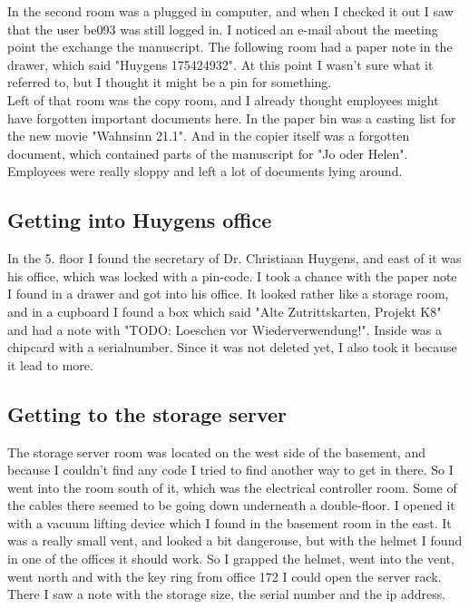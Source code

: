 In the second room was a plugged in computer, and when I checked it out I saw that the user be093 was still logged in. I noticed an e-mail about the meeting point the exchange the manuscript. The following room had a paper note in the drawer, which said "Huygens 175424932". At this point I wasn't sure what it referred to, but I thought it might be a pin for something. \\

Left of that room was the copy room, and I already thought employees might have forgotten important documents here. In the paper bin was a casting list for the new movie "Wahnsinn 21.1". And in the copier itself was a forgotten document, which contained parts of the manuscript for "Jo oder Helen". Employees were really sloppy and left a lot of documents lying around.\\

\subsection{Getting into Huygens office}
In the 5. floor I found the secretary of Dr. Christiaan Huygens, and east of it was his office, which was locked with a pin-code. I took a chance with the paper note I found in a drawer and got into his office. It looked rather like a storage room, and in a cupboard I found a box which said "Alte Zutrittskarten, Projekt K8" and had a note with "TODO: Loeschen vor Wiederverwendung!". Inside was a chipcard with a serialnumber. Since it was not deleted yet, I also took it because it lead to more.

\subsection{Getting to the storage server}
The storage server room was located on the west side of the basement, and because I couldn't find any code I tried to find another way to get in there. So I went into the room south of it, which was the electrical controller room. Some of the cables there seemed to be going down underneath a double-floor. I opened it with a vacuum lifting device which I found in the basement room in the east. It was a really small vent, and looked a bit dangerouse, but with the helmet I found in one of the offices it should work. So I grapped the helmet, went into the vent, went north and with the key ring from office 172 I could open the server rack. There I saw a note with the storage size, the serial number and the ip address. 
